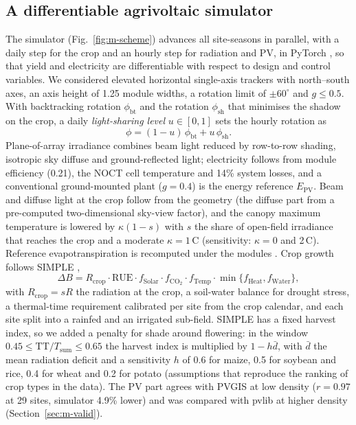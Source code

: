 \subsection{A differentiable agrivoltaic simulator}\label{sec:m-sim}
The simulator (Fig.~\ref{fig:m-scheme}) advances all site-seasons in parallel, with a daily step for the crop and an hourly step for radiation and PV, in PyTorch \citep{paszke2019}, so that yield and electricity are differentiable with respect to design and control variables. We considered elevated horizontal single-axis trackers with north--south axes, an axis height of 1.25 module widths, a rotation limit of $\pm60^\circ$ and $g\le0.5$. With backtracking rotation $\phi_{\mathrm{bt}}$ \citep{lorenzo2011,marion2013} and the rotation $\phi_{\mathrm{sh}}$ that minimises the shadow on the crop, a daily \emph{light-sharing level} $u\in[0,1]$ sets the hourly rotation as
\begin{equation}
\phi=(1-u)\,\phi_{\mathrm{bt}}+u\,\phi_{\mathrm{sh}}.
\label{eq:phi}
\end{equation}
Plane-of-array irradiance combines beam light reduced by row-to-row shading, isotropic sky diffuse and ground-reflected light; electricity follows from module efficiency (0.21), the NOCT cell temperature and 14\% system losses, and a conventional ground-mounted plant ($g=0.4$) is the energy reference $E_{\mathrm{PV}}$. Beam and diffuse light at the crop follow from the geometry (the diffuse part from a pre-computed two-dimensional sky-view factor), and the canopy maximum temperature is lowered by $\kappa(1-s)$ with $s$ the share of open-field irradiance that reaches the crop and a moderate $\kappa=1$\,\textdegree C (sensitivity: $\kappa=0$ and 2\,\textdegree C). Reference evapotranspiration is recomputed under the modules \citep{allen1998}. Crop growth follows SIMPLE \citep{zhao2019},
\begin{equation}
\Delta B=R_{\mathrm{crop}}\cdot\mathrm{RUE}\cdot f_{\mathrm{Solar}}\cdot f_{\mathrm{CO_2}}\cdot f_{\mathrm{Temp}}\cdot\min\{f_{\mathrm{Heat}},f_{\mathrm{Water}}\},
\label{eq:simple}
\end{equation}
with $R_{\mathrm{crop}}=sR$ the radiation at the crop, a soil-water balance for drought stress, a thermal-time requirement calibrated per site from the crop calendar, and each site split into a rainfed and an irrigated sub-field. SIMPLE has a fixed harvest index, so we added a penalty for shade around flowering: in the window $0.45\le\mathrm{TT}/T_{\mathrm{sum}}\le0.65$ the harvest index is multiplied by $1-h\bar d$, with $\bar d$ the mean radiation deficit and a sensitivity $h$ of 0.6 for maize, 0.5 for soybean and rice, 0.4 for wheat and 0.2 for potato (assumptions that reproduce the ranking of crop types in the data). The PV part agrees with PVGIS at low density ($r=0.97$ at 29 sites, simulator 4.9\% lower) and was compared with pvlib \citep{holmgren2018} at higher density (Section~\ref{sec:m-valid}).


